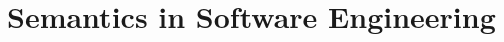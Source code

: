 

\section{Semantics in Software Engineering}
\label{cp2:artifact-semantics}























